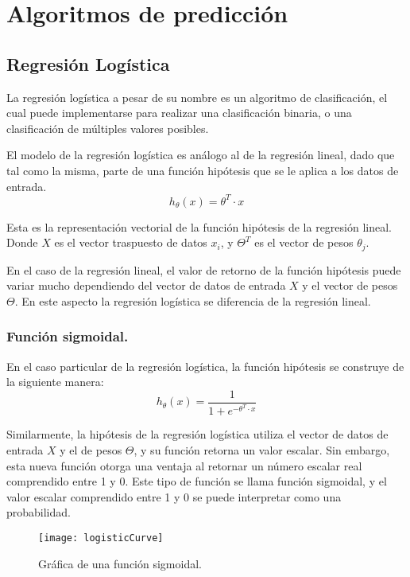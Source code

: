 
\section{Algoritmos de predicción} %
\label{sec:algoritmos_de_prediccion}

\subsection{Regresión Logística} %
\label{sub:regresion_logistica}

La regresión logística a pesar de su nombre es un algoritmo de clasificación, el cual puede implementarse para realizar una clasificación binaria, o una clasificación de múltiples valores posibles.

El modelo de la regresión logística es análogo al de la regresión lineal, dado que tal como la misma, parte de una función hipótesis que se le aplica a los datos de entrada.
\begin{equation}
h_{\theta}(x)= \theta^T \cdot x
\end{equation}
\begin{small}
Esta es la representación vectorial de la función hipótesis de la regresión lineal. Donde $X$ es el vector traspuesto de datos $x_{i}$, y $\Theta^T$ es el vector de pesos $\theta_{j}$.
\end{small} \newline

En el caso de la regresión lineal, el valor de retorno de la función hipótesis puede variar mucho dependiendo del vector de datos de entrada $X$ y el vector de pesos $\Theta$. En este aspecto la regresión logística se diferencia de la regresión lineal.

\subsubsection{Función sigmoidal.}
En el caso particular de la regresión logística, la función hipótesis se construye de la siguiente manera:
\begin{equation}
h_{\theta}(x)= \frac{1}{1+e^{- \theta^T\cdot x }}
\end{equation}

Similarmente, la hipótesis de la regresión logística utiliza el vector de datos de entrada $X$ y el de pesos $\Theta$, y su función retorna un valor escalar. Sin embargo, esta nueva función otorga una ventaja al retornar un número escalar real comprendido entre 1 y 0. Este tipo de función se llama función sigmoidal, y el valor escalar comprendido entre 1 y 0 se puede interpretar como una probabilidad.
\begin{figure}[H]
\centering
\texttt{[image: logisticCurve]}
\caption{Gráfica de una función sigmoidal.}
\label{fig:logisticCurve}
\end{figure}

